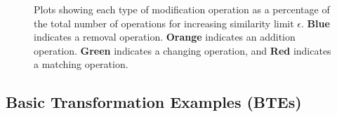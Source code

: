 \begin{figure}
{\begin{tabular}{lcccc}
\end{tabular}
}
\caption{Plots showing each type of modification operation as a percentage of the total number of operations for increasing similarity limit $\epsilon$. {\color{color1} \textbf{Blue}} indicates a removal operation. {\color{color2} \textbf{Orange}} indicates an addition operation. {\color{color3} \textbf{Green}} indicates a changing operation, and {\color{color4} \textbf{Red}} indicates a matching operation. }
\label{fig:operations}
\end{figure}






\subsection{Basic Transformation Examples (BTEs)}
\label{ssec:results-examples}

